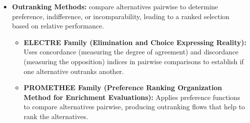 \begin{itemize}
    \item \textbf{Outranking Methods:} compare alternatives pairwise to determine preference, indifference, or incomparability, leading to a ranked selection based on relative performance.
    \begin{itemize}
        \item \textbf{ELECTRE Family (Elimination and Choice Expressing Reality):}
        Uses concordance (measuring the degree of agreement) and discordance (measuring the opposition) indices in pairwise comparisons to establish if one alternative outranks another.
        \item \textbf{PROMETHEE Family (Preference Ranking Organization Method for Enrichment Evaluations):} Applies preference functions to compare alternatives pairwise, producing outranking flows that help to rank the alternatives.
    \end{itemize}
\end{itemize} 





